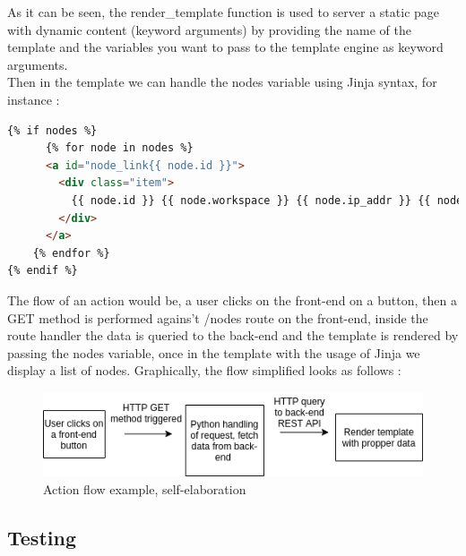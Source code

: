 \documentclass{article}
\begin{document}
As it can be seen, the render\_template function is used to server a static page with dynamic content (keyword arguments) by providing the name of the template and the variables you want to pass to the template engine as keyword arguments.
~\\

Then in the template we can handle the nodes variable using Jinja syntax, for instance :

\begin{lstlisting}[language=HTML]
{% if nodes %}
      {% for node in nodes %}
      <a id="node_link{{ node.id }}">
        <div class="item">
          {{ node.id }} {{ node.workspace }} {{ node.ip_addr }} {{ node.user }}
        </div>
      </a>
    {% endfor %}
{% endif %}
\end{lstlisting}

The flow of an action would be, a user clicks on the front-end on a button, then a GET method is performed agains't /nodes route on the front-end, inside the route handler the data is queried to the back-end and the template is rendered by passing the nodes variable, once in the template with the usage of Jinja we display a list of nodes. Graphically, the flow simplified looks as follows :

\begin{figure}[H]
    \centering
    \includegraphics[scale=0.6]{frontendflow}
    \caption{Action flow example, self-elaboration}
\end{figure}

\newpage
\subsection{Testing}
\end{document}
